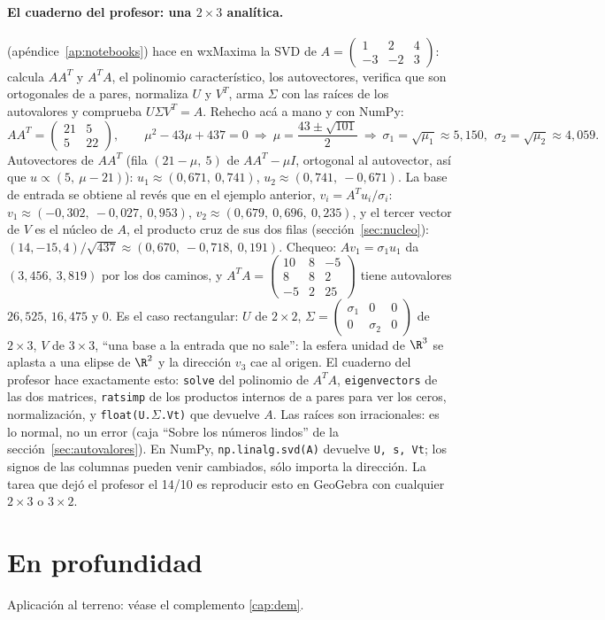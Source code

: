 \paragraph{El cuaderno del profesor: una \texorpdfstring{$2\times3$}{2x3} analítica.}
 (apéndice~\ref{ap:notebooks}) hace en wxMaxima la SVD de
\(A=\begin{pmatrix}1&2&4\\-3&-2&3\end{pmatrix}\): calcula \(AA^T\) y \(A^TA\), el
polinomio característico, los autovectores, verifica que son ortogonales de a pares,
normaliza \(U\) y \(V^T\), arma \(\Sigma\) con las raíces de los autovalores y comprueba
\(U\Sigma V^T=A\). Rehecho acá a mano y con NumPy:
\[
  AA^T=\begin{pmatrix}21&5\\5&22\end{pmatrix},\qquad
  \mu^2-43\mu+437=0\ \Rightarrow\ \mu=\frac{43\pm\sqrt{101}}2
  \ \Rightarrow\ \sigma_1=\sqrt{\mu_1}\approx5{,}150,\ \ \sigma_2=\sqrt{\mu_2}\approx4{,}059 .
\]
Autovectores de \(AA^T\) (fila \((21-\mu,\ 5)\) de \(AA^T-\mu I\), ortogonal al autovector,
así que \(u\propto(5,\ \mu-21)\)): \(u_1\approx(0{,}671,\ 0{,}741)\),
\(u_2\approx(0{,}741,\ -0{,}671)\). La base de entrada se obtiene al revés que en el
ejemplo anterior, \(v_i=A^Tu_i/\sigma_i\):
\(v_1\approx(-0{,}302,\ -0{,}027,\ 0{,}953)\), \(v_2\approx(0{,}679,\ 0{,}696,\ 0{,}235)\),
y el tercer vector de \(V\) es el núcleo de \(A\), el producto cruz de sus dos filas
(sección~\ref{sec:nucleo}): \((14,-15,4)/\sqrt{437}\approx(0{,}670,\ -0{,}718,\ 0{,}191)\).
Chequeo: \(Av_1=\sigma_1u_1\) da \((3{,}456,\ 3{,}819)\) por los dos caminos, y
\(A^TA=\begin{pmatrix}10&8&-5\\8&8&2\\-5&2&25\end{pmatrix}\) tiene autovalores
\(26{,}525\), \(16{,}475\) y \(0\). Es el caso rectangular: \(U\) de \(2\times2\),
\(\Sigma=\begin{pmatrix}\sigma_1&0&0\\0&\sigma_2&0\end{pmatrix}\) de \(2\times3\), \(V\) de
\(3\times3\), ``una base a la
entrada que no sale'': la esfera unidad de \(\R^3\) se aplasta a una elipse de
\(\R^2\) y la dirección \(v_3\) cae al origen. El cuaderno del profesor hace exactamente esto: \texttt{solve} del polinomio de
\(A^TA\), \texttt{eigenvectors} de las dos matrices, \texttt{ratsimp} de los productos
internos de a pares para ver los ceros, normalización, y \texttt{float(U.\(\Sigma\).Vt)}
que devuelve \(A\). Las raíces son irracionales: es lo normal, no un error
(caja ``Sobre los números lindos'' de la sección~\ref{sec:autovalores}). En NumPy,
\texttt{np.linalg.svd(A)} devuelve \texttt{U, s, Vt}; los signos de las columnas pueden
venir cambiados, sólo importa la dirección. La tarea que dejó el profesor el 14/10 es
reproducir esto en GeoGebra con cualquier \(2\times3\) o \(3\times2\).

\section{En profundidad}


Aplicación al terreno: véase el complemento \ref{cap:dem}.
